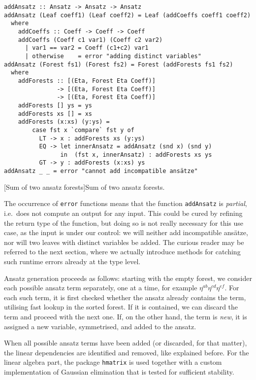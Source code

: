\begin{code}
  \begin{verbatim}
addAnsatz :: Ansatz -> Ansatz -> Ansatz
addAnsatz (Leaf coeff1) (Leaf coeff2) = Leaf (addCoeffs coeff1 coeff2)
  where
    addCoeffs :: Coeff -> Coeff -> Coeff
    addCoeffs (Coeff c1 var1) (Coeff c2 var2)
      | var1 == var2 = Coeff (c1+c2) var1
      | otherwise    = error "adding distinct variables"
addAnsatz (Forest fs1) (Forest fs2) = Forest (addForests fs1 fs2)
  where
    addForests :: [(Eta, Forest Eta Coeff)]
               -> [(Eta, Forest Eta Coeff)]
               -> [(Eta, Forest Eta Coeff)]
    addForests [] ys = ys
    addForests xs [] = xs
    addForests (x:xs) (y:ys) =
        case fst x `compare` fst y of
          LT -> x : addForests xs (y:ys)
          EQ -> let innerAnsatz = addAnsatz (snd x) (snd y)
                in  (fst x, innerAnsatz) : addForests xs ys
          GT -> y : addForests (x:xs) ys
addAnsatz _ _ = error "cannot add incompatible ansätze"
  \end{verbatim}
  [Sum of two ansatz forests]{Sum of two ansatz forests.}
  \label{code_haskell_ansatz_sum}
\end{code}
The occurrence of \texttt{error} functions means that the function \texttt{addAnsatz} is \emph{partial}, i.e.\ does not compute an output for any input. This could be cured by refining the return type of the function, but doing so is not really necessary for this use case, as the input is under our control: we will neither add incompatible ansätze, nor will two leaves with distinct variables be added. The curious reader may be referred to the next section, where we actually introduce methods for catching such runtime errors already at the type level.

Ansatz generation proceeds as follows: starting with the empty forest, we consider each possible ansatz term separately, one at a time, for example $\eta^{ab} \eta^{cd} \eta^{ef}$. For each such term, it is first checked whether the ansatz already contains the term, utilising fast lookup in the sorted forest. If it is contained, we can discard the term and proceed with the next one. If, on the other hand, the term is \emph{new}, it is assigned a new variable, symmetrised, and added to the ansatz.

When all possible ansatz terms have been added (or discarded, for that matter), the linear dependencies are identified and removed, like explained before. For the linear algebra part, the package \texttt{hmatrix} \cite{Ruiz_2006} is used together with a custom implementation of Gaussian elimination that is tested for sufficient stability.

